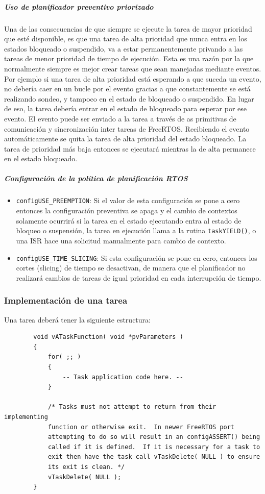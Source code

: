     \subparagraph{Uso de planificador preventivo priorizado}
    
    Una de las consecuencias de que siempre se ejecute la tarea de mayor prioridad que esté disponible, es que una tarea de alta prioridad que nunca entra en los estados bloqueado o suspendido, va a estar permanentemente privando a las tareas de menor prioridad de tiempo de ejecución. Esta es una razón por la que normalmente siempre es mejor crear tareas que sean manejadas mediante eventos. Por ejemplo si una tarea de alta prioridad está esperando a que suceda un evento, no debería caer en un bucle por el evento gracias a que constantemente se está realizando sondeo, y tampoco en el estado de bloqueado o suspendido. En lugar de eso, la tarea debería entrar en el estado de bloqueado para esperar por ese evento. El evento puede ser enviado a la tarea a través de as primitivas de comunicación y sincronización inter tareas de FreeRTOS. Recibiendo el evento automáticamente se quita la tarea de alta prioridad del estado bloqueado. La tarea de prioridad más baja entonces se ejecutará mientras la de alta permanece en el estado bloqueado.
    
    \subparagraph{Configuración de la política de planificación RTOS}
    
    \begin{itemize}
        \item \texttt{configUSE\_PREEMPTION}: Si el valor de esta configuración se pone a cero entonces la configuración preventiva se apaga y el cambio de contextos solamente ocurrirá si la tarea en el estado ejecutando entra al estado de bloqueo o suspensión, la tarea en ejecución llama a la rutina \texttt{taskYIELD()}, o una ISR hace una solicitud manualmente para cambio de contexto.
        \item \texttt{configUSE\_TIME\_SLICING}: Si esta configuración se pone en cero, entonces los cortes (slicing) de tiempo se desactivan, de manera que el planificador no realizará cambios de tareas de igual prioridad en cada interrupción de tiempo.
    \end{itemize}
    
    \subsubsection{Implementación de una tarea}
    
    Una tarea deberá tener la siguiente estructura:
    
    \begin{verbatim}
        void vATaskFunction( void *pvParameters )
        {
            for( ;; )
            {
                -- Task application code here. --
            }
    
            /* Tasks must not attempt to return from their implementing
            function or otherwise exit.  In newer FreeRTOS port
            attempting to do so will result in an configASSERT() being
            called if it is defined.  If it is necessary for a task to
            exit then have the task call vTaskDelete( NULL ) to ensure
            its exit is clean. */
            vTaskDelete( NULL );
        }
    \end{verbatim}
    

